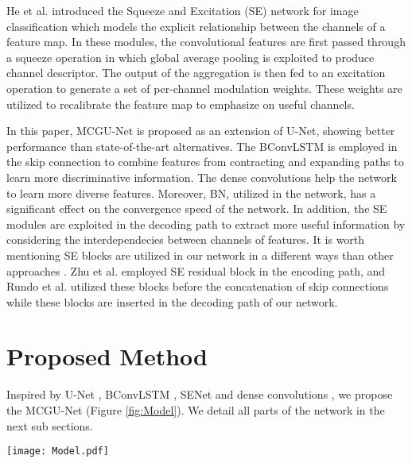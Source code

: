 \documentclass[journal]{IEEEtran}
\begin{document}
He et al. \cite{hu2018squeeze} introduced the Squeeze and Excitation (SE) network for image classification which models the explicit relationship between the channels of a feature map. In these modules, the convolutional features are first passed through a squeeze operation in which global average pooling is exploited to produce channel descriptor. The output of the aggregation is then fed to an excitation operation to generate a set of per-channel modulation weights. These weights are utilized to recalibrate the feature map to emphasize on useful channels. 




In this paper, MCGU-Net is proposed as an extension of U-Net, showing better performance than state-of-the-art alternatives. The BConvLSTM is employed in the skip connection to combine features from contracting and expanding paths to learn more discriminative information. The dense convolutions help the network to learn more diverse features. Moreover, BN, utilized in the network, has a significant effect on the convergence speed of the network. In addition, the SE modules are exploited in the decoding path to extract more useful information by considering the interdependecies between channels of features. It is worth mentioning SE blocks are utilized in our network in a different ways than other approaches \cite{rundo2019use,zhu2018anatomynet}. Zhu et al. \cite{zhu2018anatomynet} employed SE residual block in the encoding path, and Rundo et al. utilized these blocks before the concatenation of skip connections while these blocks are inserted in the decoding path of our network.


\section{Proposed Method}
Inspired by U-Net \cite{ronneberger2015}, BConvLSTM \cite{song2018pyramid}, SENet \cite{hu2018squeeze} and dense convolutions \cite{huang2017densely}, we propose the MCGU-Net (Figure \ref{fig:Model}). We detail all parts of the network in the next sub sections.



\begin{figure*}
\centering
\texttt{[image: Model.pdf]}
\caption{MCGU-Net with bi-directional ConvLSTM in the skip connections, SE modlues in the decoding path, and densely connected convolution.} \label{fig:Model}
\vspace*{-\baselineskip}
\end{figure*}
\end{document}
